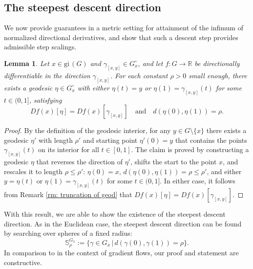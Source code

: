 \documentclass{article}
\theoremstyle{plain}\newtheorem{theorem}{Theorem}[section]
\theoremstyle{plain}\newtheorem{definition}[theorem]{Definition}
\theoremstyle{plain}\newtheorem{lemma}[theorem]{Lemma}
\theoremstyle{definition}\newtheorem{remark}[theorem]{Remark}
\theoremstyle{definition}\newtheorem{example}[theorem]{Example}
\theoremstyle{plain}\newtheorem{proposition}[theorem]{Proposition}
\theoremstyle{plain}\newtheorem{inference}[theorem]{Inference}
\theoremstyle{plain}\newtheorem{corollary}[theorem]{Corollary}
\theoremstyle{plain}\newtheorem{assumption}[theorem]{Assumption}
\begin{document}
\subsection{The steepest descent direction}\label{s:steepest descent}
We now provide guarantees in a metric setting for attainment of the infimum of normalized directional derivatives, and show that such a descent step provides admissible step scalings.
\begin{lemma}\label{lem: core property}
    Let $x\in \mathrm{gi}\,(G)$ and $\gamma_{[x,y]}\in G_x^{\circ}$, and let $f:G\to\mathbb{R}$ be directionally differentiable in the direction $\gamma_{[x,y]}$.
    For each constant $\rho>0$ small enough, there exists a geodesic $\eta\in G_x^{\circ}$ with either $\eta(t)=y$
    or $\eta(1)=\gamma_{[x,y]}(t)$ for some $t\in (0,1]$, satisfying
    $$
    Df(x)[\eta]=Df(x)[\gamma_{[x,y]}] \quad\text{and}\quad d(\eta(0),\eta(1))=\rho.
    $$
\end{lemma}
\begin{proof}
    By the definition of the geodesic interior, for any $y\in G\setminus\{x\}$ there exists a geodesic $\eta'$ with length $\rho'$ and starting point  $\eta'(0)=y$ that contains the points $\gamma_{[x,y]}(t)$ on its interior for all $t\in [0,1]$. The claim is proved by constructing a geodesic $\eta$ that reverses the direction of $\eta'$, shifts the start to the point $x$, and rescales it to length $\rho\leq \rho'$: $\eta(0)=x$, $d(\eta(0), \eta(1))=\rho\leq \rho'$, and either $y=\eta(t)$ or $\eta(1)=\gamma_{[x,y]}(t)$ for some $t\in (0,1]$. In either case, it follows from Remark \ref{rm: truncation of geod} that $Df(x)[\eta]=Df(x)[\gamma_{[x,y]}]$.
\end{proof}
With this result, we are able to show the existence of the steepest descent direction. As in the Euclidean case, the steepest descent direction can be found by searching over spheres of a fixed radius:
$$
\mathbb{S}^{G_x}_{\rho}:=\bigl\{ \gamma\in G_x \,\big|\, d(\gamma(0),\gamma(1))=\rho \bigr\}.
$$
In comparison to \cite[Theorem 3.2]{DeGMarTos80} in the context of gradient flows, our proof and statement are constructive.
\end{document}
